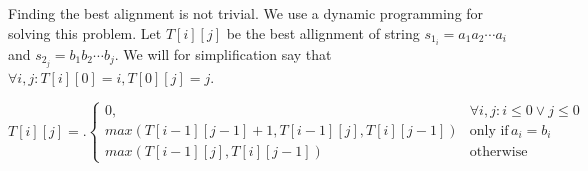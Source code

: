 Finding the best alignment is not trivial. We use a dynamic programming for
solving this problem. Let $T[i][j]$ be the best allignment of string $s_{1_i} = a_1a_2\cdots a_i$
and $s_{2_j} = b_1b_2\cdots b_j$. We will for simplification say that $\forall i, j: T[i][0] = i, T[0][j] = j$.

\[
T[i][j] = \bigl.
  \begin{cases}
    0, & \forall i,j : i\leq 0 \lor j\leq 0 \\
    max(T[i-1][j-1] + 1, T[i-1][j], T[i][j-1]) & \text{only if} \, a_i = b_i \\ 
    max(T[i-1][j], T[i][j-1]) & \text{otherwise}
  \end{cases}
\]

